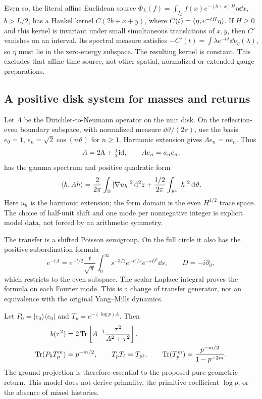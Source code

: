 Even so, the literal affine Euclidean source
$\Phi_L(f)=\int_{I_L}f(x)e^{-(b+x)H}\eta\dd x$, $b>L/2$,
has a Hankel kernel $C(2b+x+y)$, where $C(t)=\langle \eta,e^{-tH}\eta\rangle$.
If $H\geq0$ and this kernel is invariant under small simultaneous
translations of $x,y$, then $C'$ vanishes on an interval. Its spectral
measure satisfies
$-C'(t)=\int\lambda e^{-t\lambda}\dd\nu_\eta(\lambda)$, so
$\eta$ must lie in the zero-energy subspace. The resulting kernel is
constant. This excludes that affine-time source, not other spatial,
normalized or extended gauge preparations.

\subsection{A positive disk system for masses and returns}
Let $\Lambda$ be the Dirichlet-to-Neumann operator on the unit disk.
On the reflection-even boundary subspace, with normalized measure
$\dd\vartheta/(2\pi)$, use the basis
$e_0=1$, $e_n=\sqrt2\cos(n\vartheta)$ for $n\geq1$.
Harmonic extension gives $\Lambda e_n=ne_n$. Thus
\begin{equation}\label{eq:disk-A}
 A=2\Lambda+\tfrac12\mathrm{id},
 \qquad Ae_n=a_ne_n,
\end{equation}
has the gamma spectrum and positive quadratic form
\begin{equation}\label{eq:disk-energy}
 \langle h,Ah\rangle=\frac2{2\pi}\int_{\mathbb D}|\nabla u_h|^2\,\mathrm d^2z
       +\frac{1/2}{2\pi}\int_{S^1}|h|^2\,\mathrm d\vartheta.
\end{equation}
Here $u_h$ is the harmonic extension; the form domain is the even
$H^{1/2}$ trace space. The choice of half-unit shift and one mode
per nonnegative integer is explicit model data, not forced by an
arithmetic symmetry.

The transfer is a shifted Poisson semigroup. On the full circle it
also has the positive subordination formula
\begin{equation}\label{eq:subordination}
 e^{-tA}=e^{-t/2}\frac t{\sqrt\pi}
 \int_0^\infty s^{-3/2}e^{-t^2/s}e^{-sD^2}\dd s,
 \qquad D=-i\partial_\vartheta,
\end{equation}
which restricts to the even subspace. The scalar Laplace integral
proves the formula on each Fourier mode. This is a change of transfer
generator, not an equivalence with the original Yang--Mills dynamics.

Let $P_0=|e_0\rangle\langle e_0|$ and $T_p=e^{-(\log p)A}$.
Then
\begin{align}
 b(\tau^2)&=2\operatorname{Tr}\left[A^{-1}\frac{\tau^2}{A^2+\tau^2}\right],
 \notag\\
 \operatorname{Tr}(P_0T_p^m)&=p^{-m/2},\qquad
 T_pT_\ell=T_{p\ell},\qquad
 \operatorname{Tr}(T_p^m)=\frac{p^{-m/2}}{1-p^{-2m}}.
 \label{eq:disk-transfer}
\end{align}
The ground projection is therefore essential to the proposed pure
geometric return. This model does not derive primality, the primitive
coefficient $\log p$, or the absence of mixed histories.

